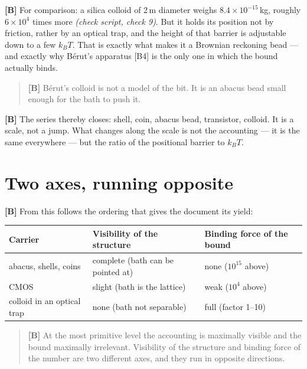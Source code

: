 \textbf{[B]} For comparison: a silica colloid of 2\,\textmu m diameter weighs
$8.4\times10^{-15}$\,kg, roughly $6\times10^{4}$ times more \emph{(check script, check 9)}. But
it holds its position not by friction, rather by an optical trap, and the height
of that barrier is adjustable down to a few $k_BT$. That is exactly what makes it
a Brownian reckoning bead --- and exactly why Bérut's apparatus [B4] is the only
one in which the bound actually binds.

\begin{quote}
\textbf{[B]} Bérut's colloid is not a model of the bit. It is an abacus bead small enough
for the bath to push it.
\end{quote}

\textbf{[B]} The series thereby closes: shell, coin, abacus bead, transistor, colloid. It
is a scale, not a jump. What changes along the scale is not the accounting --- it
is the same everywhere --- but the ratio of the positional barrier to $k_BT$.

\section{Two axes, running opposite}

\textbf{[B]} From this follows the ordering that gives the document its yield:

\begin{center}
\small
\begin{tabular}{@{}lll@{}}
\toprule
\textbf{Carrier} & \textbf{Visibility of the structure} & \textbf{Binding force of the bound} \\
\midrule
abacus, shells, coins & complete (bath can be pointed at) & none ($10^{15}$ above) \\
CMOS & slight (bath is the lattice) & weak ($10^{4}$ above) \\
colloid in an optical trap & none (bath not separable) & full (factor 1--10) \\
\bottomrule
\end{tabular}
\end{center}

\begin{quote}
\textbf{[B]} At the most primitive level the accounting is maximally visible and the bound
maximally irrelevant. Visibility of the structure and binding force of the number
are two different axes, and they run in opposite directions.
\end{quote}

